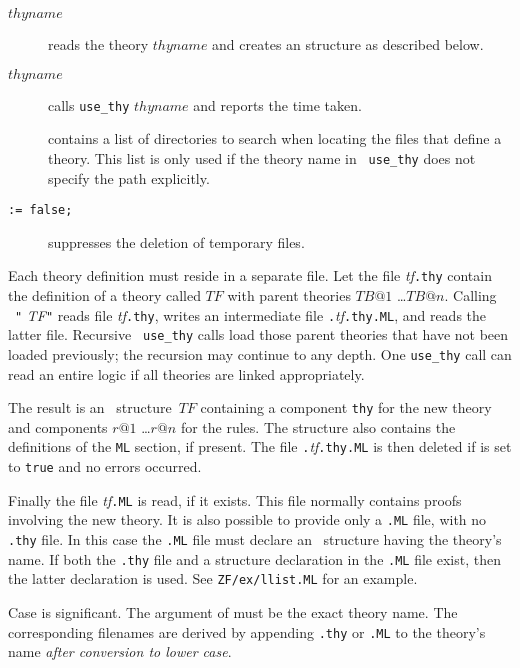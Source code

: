 \begin{description}
\item[ $thyname$] 
  reads the theory $thyname$ and creates an \ML{} structure as described below.

\item[ $thyname$] 
  calls {\tt use_thy} $thyname$ and reports the time taken.

\item[] 
  contains a list of directories to search when locating the files that
  define a theory.  This list is only used if the theory name in {\tt
    use_thy} does not specify the path explicitly.

\item[ \tt:= false;] 
suppresses the deletion of temporary files.
\end{description}
%
Each theory definition must reside in a separate file.  Let the file {\it
  tf}{\tt.thy} contain the definition of a theory called $TF$ with parent
theories $TB@1$ \dots $TB@n$.  Calling ~{\tt"}{\it
  TF\/}{\tt"} reads file {\it tf}{\tt.thy}, writes an intermediate \ML{}
file {\tt.}{\it tf}{\tt.thy.ML}, and reads the latter file.  Recursive {\tt
  use_thy} calls load those parent theories that have not been loaded
previously; the recursion may continue to any depth.  One {\tt use_thy}
call can read an entire logic if all theories are linked appropriately.

The result is an \ML\ structure~$TF$ containing a component {\tt thy} for
the new theory and components $r@1$ \dots $r@n$ for the rules.  The
structure also contains the definitions of the {\tt ML} section, if
present.  The file {\tt.}{\it tf}{\tt.thy.ML} is then deleted if
 is set to {\tt true} and no errors occurred.

Finally the file {\it tf}{\tt.ML} is read, if it exists.  This file
normally contains proofs involving the new theory.  It is also possible to
provide only a {\tt.ML} file, with no {\tt.thy} file.  In this case the
{\tt.ML} file must declare an \ML\ structure having the theory's name.  If
both the {\tt.thy} file and a structure declaration in the {\tt.ML} file
exist, then the latter declaration is used.  See {\tt ZF/ex/llist.ML} for
an example.

\begin{warn}
  Case is significant.  The argument of  must be the exact
  theory name.  The corresponding filenames are derived by appending
  {\tt.thy} or {\tt.ML} to the theory's name {\it after conversion to lower
    case}. 
\end{warn}


